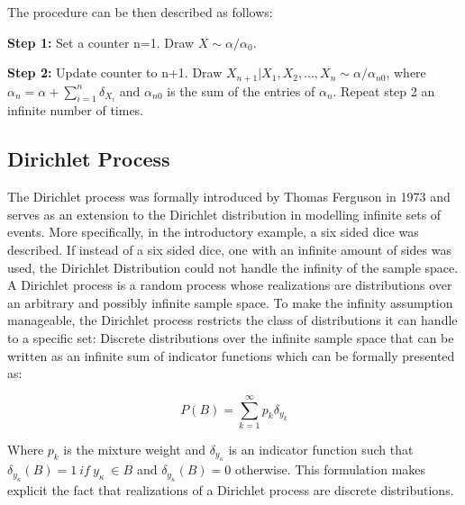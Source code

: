 \documentclass [twoside,hidelinks]{article}
\begin{document}
The procedure can be then described as follows:
\begin{compactitem}

	\item \textbf{Step 1:} Set a counter n=1. Draw $ X \sim \alpha / \alpha_0 $. 
	\item \textbf{Step 2:} Update counter to n+1. Draw $ X_{n+1} | X_1, X_2, ..., X_n \sim \alpha / \alpha_{n0}$, where $\alpha_n = \alpha + \sum_{i=1}^n \delta_{X_i} $ and $ \alpha_{n0}$ is the sum of the entries of $\alpha_n$. Repeat step 2 an infinite number of times.
\end{compactitem}

\subsection{Dirichlet Process}

The Dirichlet process was formally introduced by Thomas Ferguson in 1973 and serves as an extension to the Dirichlet distribution in modelling infinite sets of events. More specifically, in the introductory example, a six sided dice was described. If instead of a six sided dice, one with an infinite amount of sides was used, the Dirichlet Distribution could not handle the infinity of the sample space. A Dirichlet process is a random process whose realizations are distributions over an arbitrary and possibly infinite sample space. To make the infinity assumption manageable, the Dirichlet process restricts the class of distributions it can handle to a specific set: Discrete distributions over the infinite sample space that can be written as an infinite sum of indicator functions which can be formally presented as:

\begin{equation}
 P ( B ) = \sum_{k=1}^\infty p_k \delta_{y_k} 
 \end{equation}

Where $p_k$ is the mixture weight and $\delta_{y_\kappa}$ is an indicator function such that $\delta_{y_\kappa}  (B)=1\ if\ y_{\kappa}\ \in B$ and  $\delta_{y_\kappa} (B)=0$ otherwise. This formulation makes explicit the fact that realizations of a Dirichlet process are discrete distributions.
\end{document}
